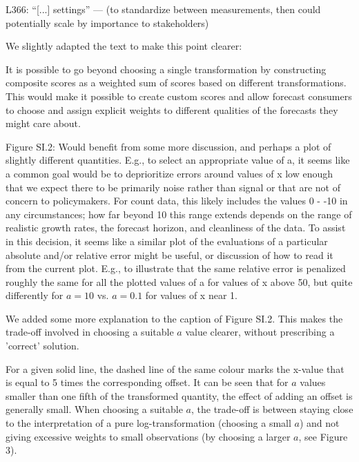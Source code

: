 \documentclass{article}
\newcommand{\black}{\color{black}}
\newcommand{\blue}{\color{blue}}
\newcommand{\indented}{\setlength{\leftskip}{1cm}}
\newcommand{\notindented}{\setlength{\leftskip}{0cm}}
\begin{document}
\notindented

\blue
L366: “[...] settings” — (to standardize between measurements, then
could potentially scale by importance to stakeholders)

\black
We slightly adapted the text to make this point clearer: 

\indented
It is possible to go beyond choosing a single transformation by constructing composite scores as a weighted sum of scores based on different transformations. This would make it possible to create custom scores and allow forecast consumers to choose and assign explicit weights to different qualities of the forecasts they might care about.

\notindented


\blue
Figure SI.2: Would benefit from some more discussion, and perhaps a plot of slightly different quantities. E.g., to select an appropriate value of a, it seems like a common goal would be to deprioritize errors around values of x low enough that we expect there to be primarily noise rather than signal or that are not of concern to policymakers. For count data, this likely includes the values 0 - -10 in any circumstances; how far beyond 10 this range extends depends on the range of realistic growth rates, the forecast horizon, and cleanliness of the data. To assist in this decision, it seems like a similar plot of the evaluations of a particular absolute and/or relative error might be useful, or discussion of how to read it from the current plot. E.g., to illustrate that the same relative error is penalized roughly the same for all the plotted values of a for values of x above 50, but quite differently for $a = 10$ vs. $a = 0.1$ for values of x near 1.

\black

We added some more explanation to the caption of Figure SI.2. This makes the trade-off involved in choosing a suitable $a$ value clearer, without prescribing a 'correct' solution. 

\indented
For a given solid line, the dashed line of the same colour marks the x-value that  is equal to 5 times the corresponding offset. It can be seen that for $a$ values smaller than one fifth of the transformed quantity, the effect of adding an offset is generally small. When choosing a suitable $a$, the trade-off is between staying close to the interpretation of a pure log-transformation (choosing a small $a$) and not giving excessive weights to small observations (by choosing a larger $a$, see Figure 3).
\end{document}
